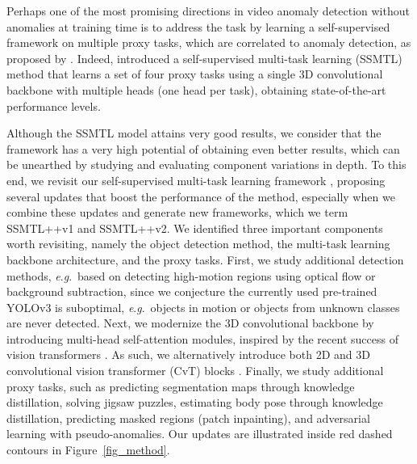 \documentclass[times,twocolumn,final,authoryear]{elsarticle}
\newcommand{\eg}{\textit{e}.\textit{g}.}
\begin{document}
Perhaps one of the most promising directions in video anomaly detection without anomalies at training time is to address the task by learning a self-supervised framework on multiple proxy tasks, which are correlated to anomaly detection, as proposed by \cite{Georgescu-CVPR-2021}. Indeed, \cite{Georgescu-CVPR-2021} introduced a self-supervised multi-task learning (SSMTL) method that learns a set of four proxy tasks using a single 3D convolutional backbone with multiple heads (one head per task), obtaining state-of-the-art performance levels. 

Although the SSMTL model attains very good results, we consider that the framework has a very high potential of obtaining even better results, which can be unearthed by studying and evaluating component variations in depth. 
To this end, we revisit our self-supervised multi-task learning framework \citep{Georgescu-CVPR-2021}, proposing several updates that boost the performance of the method, especially when we combine these updates and generate new frameworks, which we term SSMTL++v1 and SSMTL++v2. 
We identified three important components worth revisiting, namely the object detection method, the multi-task learning backbone architecture, and the proxy tasks. First, we study additional detection methods, \eg~based on detecting high-motion regions using optical flow or background subtraction, since we conjecture the currently used pre-trained YOLOv3 is suboptimal, \eg~objects in motion or objects from unknown classes are never detected. Next, we modernize the 3D convolutional backbone by introducing multi-head self-attention modules, inspired by the recent success of vision transformers \citep{Bertasius-ICML-2021,Dosovitskiy-ICLR-2020,Wu-ICCV-2021}. As such, we alternatively introduce both 2D and 3D convolutional vision transformer (CvT) blocks \citep{Wu-ICCV-2021}. Finally, we study additional proxy tasks, such as predicting segmentation maps through knowledge distillation, solving jigsaw puzzles, estimating body pose through knowledge distillation, predicting masked regions (patch inpainting), and adversarial learning with pseudo-anomalies. Our updates are illustrated inside red dashed contours in Figure~\ref{fig_method}. 
\end{document}
